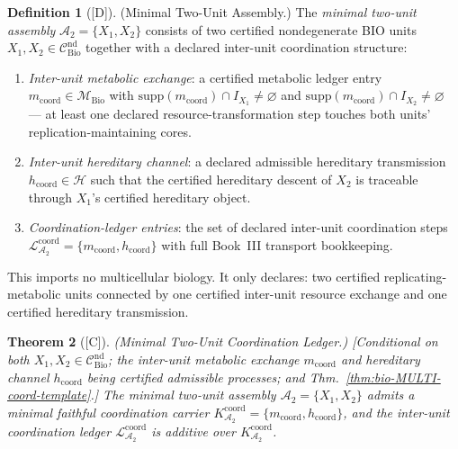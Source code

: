 \documentclass[12pt,oneside]{amsbook}
\theoremstyle{plain}
\newtheorem{theorem}{Theorem}[section]
\theoremstyle{definition}
\newtheorem{definition}[theorem]{Definition}
\theoremstyle{remark}
\newcommand{\status}[1]{\textup{[#1]}}
\begin{document}
\begin{definition}[\status{D}]\label{def:bio-twocell-assembly}
\textup{(Minimal Two-Unit Assembly.)}
The \emph{minimal two-unit assembly} $\mathcal{A}_2 = \{X_1, X_2\}$
consists of two certified nondegenerate BIO units
$X_1, X_2 \in \mathcal{C}^{\mathrm{nd}}_{\mathrm{Bio}}$ together
with a declared inter-unit coordination structure:
\begin{enumerate}[label=\textup{(\arabic*)}]
  \item \emph{Inter-unit metabolic exchange}: a certified metabolic
    ledger entry $m_{\mathrm{coord}} \in \mathcal{M}_{\mathrm{Bio}}$
    with $\mathrm{supp}(m_{\mathrm{coord}}) \cap I_{X_1} \neq \varnothing$
    and $\mathrm{supp}(m_{\mathrm{coord}}) \cap I_{X_2} \neq \varnothing$
    --- at least one declared resource-transformation step touches
    both units' replication-maintaining cores.
  \item \emph{Inter-unit hereditary channel}: a declared admissible
    hereditary transmission $h_{\mathrm{coord}} \in \mathcal{H}$
    such that the certified hereditary descent of $X_2$ is
    traceable through $X_1$'s certified hereditary object.
  \item \emph{Coordination-ledger entries}: the set of declared
    inter-unit coordination steps
    $\mathcal{L}^{\mathrm{coord}}_{\mathcal{A}_2} =
    \{m_{\mathrm{coord}}, h_{\mathrm{coord}}\}$
    with full Book~III transport bookkeeping.
\end{enumerate}
This imports no multicellular biology.  It only declares: two
certified replicating-metabolic units connected by one
certified inter-unit resource exchange and one certified
hereditary transmission.
\end{definition}

\begin{theorem}[\status{C}]\label{thm:bio-MULTI-twocell}
\textup{(Minimal Two-Unit Coordination Ledger.)}
\textup{[Conditional on both $X_1, X_2 \in
\mathcal{C}^{\mathrm{nd}}_{\mathrm{Bio}}$; the inter-unit
metabolic exchange $m_{\mathrm{coord}}$ and hereditary channel
$h_{\mathrm{coord}}$ being certified admissible processes; and
Thm.~\ref{thm:bio-MULTI-coord-template}.]}
The minimal two-unit assembly $\mathcal{A}_2 = \{X_1, X_2\}$
admits a minimal faithful coordination carrier
$K^{\mathrm{coord}}_{\mathcal{A}_2} =
\{m_{\mathrm{coord}}, h_{\mathrm{coord}}\}$, and the
inter-unit coordination ledger
$\mathcal{L}^{\mathrm{coord}}_{\mathcal{A}_2}$ is additive
over $K^{\mathrm{coord}}_{\mathcal{A}_2}$.
\end{theorem}
\end{document}
